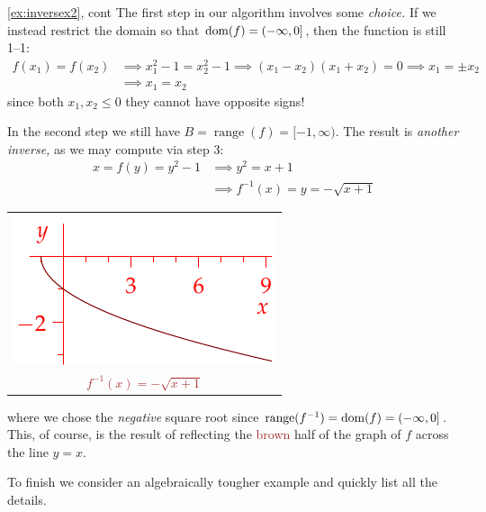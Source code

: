 \begin{example*}{\ref{ex:inversex2}, cont}{}
The first step in our algorithm involves some \emph{choice.} If we instead restrict the domain so that $\operatorname{dom}(f)=(-\infty,0]$, then the function is still 1--1:
\begin{align*}
f(x_1)=f(x_2)&\implies x_1^2-1=x_2^2-1 \implies (x_1-x_2)(x_1+x_2)=0 \implies x_1=\pm x_2\\
&\implies x_1=x_2
\end{align*}
since both $x_1,x_2\le 0$ they cannot have opposite signs!\par
\begin{minipage}[t]{0.7\linewidth}\vspace{-5pt}
In the second step we still have $B=\operatorname{range}(f)=[-1,\infty)$. The result is \emph{another inverse,} as we may compute via step 3:
\begin{align*}
x=f(y)=y^2-1&\implies y^2=x+1\\
&\implies f^{-1}(x)=y=-\sqrt{x+1}
\end{align*}
\end{minipage}\hfill\begin{minipage}[t]{0.29\linewidth}\vspace{-30pt}
\flushright\begin{tabular}{@{}c@{}}
\includegraphics{inverses-poly5}\\
\textcolor{Brown}{$f^{-1}(x)=-\sqrt{x+1}$}
\end{tabular}
\end{minipage}\medbreak
where we chose the \emph{negative} square root since $\operatorname{range}(f^{-1})=\operatorname{dom}(f)=(-\infty,0]$. This, of course, is the result of reflecting the  \textcolor{Brown}{brown} half of the graph of $f$ across the line $y=x$.
\end{example*}

\goodbreak

\fi

To finish we consider an algebraically tougher example and quickly list all the details.

